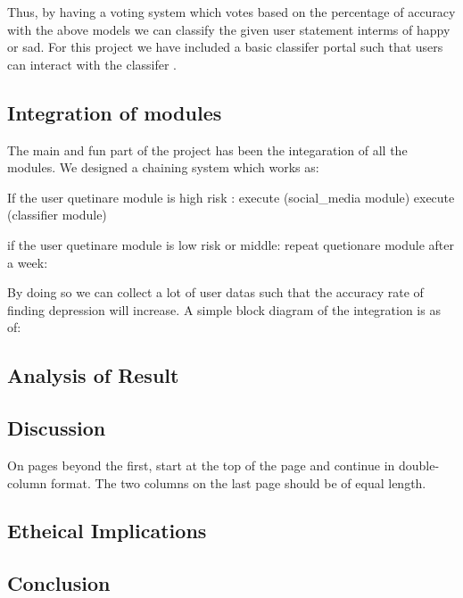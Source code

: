 \documentclass{chi2009}
\begin{document}
\begin{Abstract}
Thus, by having a voting system which votes based on the percentage of accuracy with the above models we can classify the given user statement interms of happy or sad. For this project we have included a basic classifer portal such that users can interact with the classifer .






\subsection{Integration of modules}

The main and fun part of the project has been the integaration of all the modules. We designed a chaining system which works as: 

If the user quetinare module is high risk :
  execute (social_media module)
  execute (classifier module)

if the user quetinare module is low risk or middle:
   repeat quetionare module after a week:
 
 
 By doing so we can collect a lot of user datas such that the accuracy rate of finding depression will increase. A simple block diagram of the integration is as of:
 
 
 
 
 
 
 
 

\subsection{Analysis of Result}



\subsection{Discussion}

On pages beyond the first, start at the top of the page and continue
in double-column format.  The two columns on the last page should be
of equal length.


\subsection{Etheical Implications}

\subsection{Conclusion}



\end{Abstract}
\end{document}
